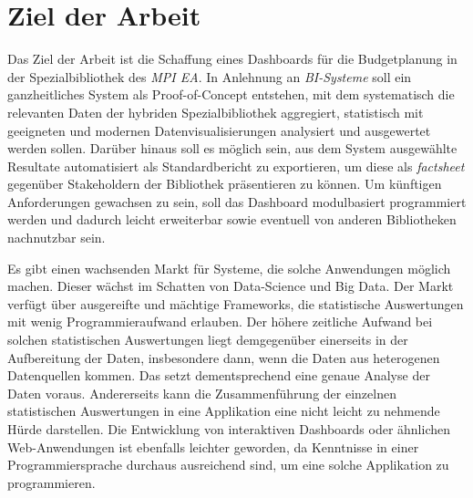 \section{Ziel der Arbeit}
Das Ziel der Arbeit ist die Schaffung eines Dashboards für die Budgetplanung in der Spezialbibliothek des \textit{\acrshort{MPI EA}}.
In Anlehnung an \textit{\acrshort{BI}-Systeme} soll ein ganzheitliches System als Proof-of-Concept entstehen,
mit dem systematisch die relevanten Daten der hybriden Spezialbibliothek aggregiert, statistisch
mit geeigneten und modernen Datenvisualisierungen analysiert und ausgewertet werden sollen.
Darüber hinaus soll es möglich sein, aus dem System ausgewählte
Resultate automatisiert als Standardbericht zu exportieren, um diese
als \textit{factsheet} gegenüber Stakeholdern der Bibliothek präsentieren zu können.
Um künftigen Anforderungen gewachsen zu sein, soll das Dashboard
modulbasiert programmiert werden und dadurch leicht erweiterbar sowie eventuell von
anderen Bibliotheken nachnutzbar sein.


Es gibt einen wachsenden Markt für Systeme, die solche Anwendungen möglich machen. Dieser wächst im Schatten von Data-Science und Big Data. 
Der Markt verfügt über ausgereifte und mächtige Frameworks, die statistische Auswertungen mit wenig Programmieraufwand erlauben. 
Der höhere zeitliche Aufwand bei solchen statistischen Auswertungen liegt demgegenüber einerseits in der Aufbereitung der Daten, insbesondere dann, wenn die Daten aus heterogenen Datenquellen kommen. 
Das setzt dementsprechend eine genaue Analyse der Daten voraus. Andererseits kann die Zusammenführung der einzelnen statistischen Auswertungen in eine Applikation 
eine nicht leicht zu nehmende Hürde darstellen. Die Entwicklung von interaktiven Dashboards oder ähnlichen Web-Anwendungen ist ebenfalls leichter geworden, da
Kenntnisse in einer Programmiersprache durchaus ausreichend sind, um eine solche Applikation zu programmieren.


